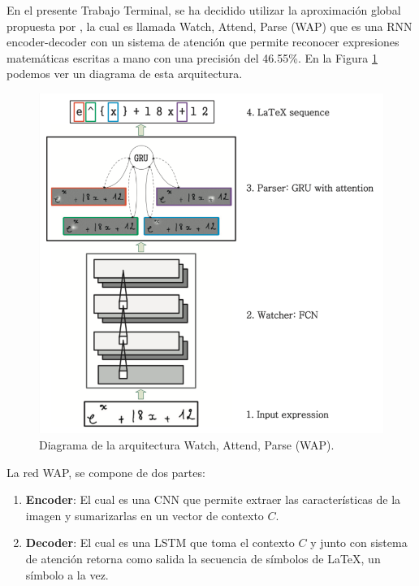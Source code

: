 En el presente Trabajo Terminal, se ha decidido utilizar la aproximación global propuesta por \cite{chino}, la cual es llamada Watch, Attend, Parse (WAP) que es una RNN encoder-decoder con un sistema de atención que permite reconocer expresiones matemáticas escritas a mano con una precisión del 46.55\%. En la Figura \ref{fig:wap} podemos ver un diagrama de esta arquitectura.\\

\begin{figure}[H]
	\centering
	\includegraphics[]{capitulo3/imgs/wap}
	\caption{Diagrama de la arquitectura Watch, Attend, Parse (WAP).}
	\label{fig:wap}
\end{figure}

La red WAP, se compone de dos partes:

\begin{enumerate}
	\item \textbf{Encoder}: El cual es una CNN que permite extraer las características de la imagen y sumarizarlas en un vector de contexto $C$.
	\item  \textbf{Decoder}: El cual es una LSTM que toma el contexto $C$ y junto con sistema de atención retorna como salida la secuencia de símbolos de \LaTeX, un símbolo a la vez.
\end{enumerate}

